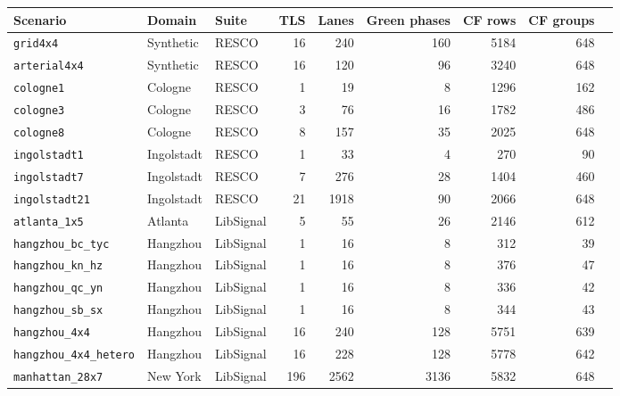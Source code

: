 \begin{tabular}{lllrrrrrr}
\toprule
Scenario & Domain & Suite & TLS & Lanes & Green phases & CF rows & CF groups \\
\midrule
\texttt{grid4x4} & Synthetic & RESCO & 16 & 240 & 160 & 5184 & 648 \\
\texttt{arterial4x4} & Synthetic & RESCO & 16 & 120 & 96 & 3240 & 648 \\
\texttt{cologne1} & Cologne & RESCO & 1 & 19 & 8 & 1296 & 162 \\
\texttt{cologne3} & Cologne & RESCO & 3 & 76 & 16 & 1782 & 486 \\
\texttt{cologne8} & Cologne & RESCO & 8 & 157 & 35 & 2025 & 648 \\
\texttt{ingolstadt1} & Ingolstadt & RESCO & 1 & 33 & 4 & 270 & 90 \\
\texttt{ingolstadt7} & Ingolstadt & RESCO & 7 & 276 & 28 & 1404 & 460 \\
\texttt{ingolstadt21} & Ingolstadt & RESCO & 21 & 1918 & 90 & 2066 & 648 \\
\texttt{atlanta\_1x5} & Atlanta & LibSignal & 5 & 55 & 26 & 2146 & 612 \\
\texttt{hangzhou\_bc\_tyc} & Hangzhou & LibSignal & 1 & 16 & 8 & 312 & 39 \\
\texttt{hangzhou\_kn\_hz} & Hangzhou & LibSignal & 1 & 16 & 8 & 376 & 47 \\
\texttt{hangzhou\_qc\_yn} & Hangzhou & LibSignal & 1 & 16 & 8 & 336 & 42 \\
\texttt{hangzhou\_sb\_sx} & Hangzhou & LibSignal & 1 & 16 & 8 & 344 & 43 \\
\texttt{hangzhou\_4x4} & Hangzhou & LibSignal & 16 & 240 & 128 & 5751 & 639 \\
\texttt{hangzhou\_4x4\_hetero} & Hangzhou & LibSignal & 16 & 228 & 128 & 5778 & 642 \\
\texttt{manhattan\_28x7} & New York & LibSignal & 196 & 2562 & 3136 & 5832 & 648 \\
\bottomrule
\end{tabular}
